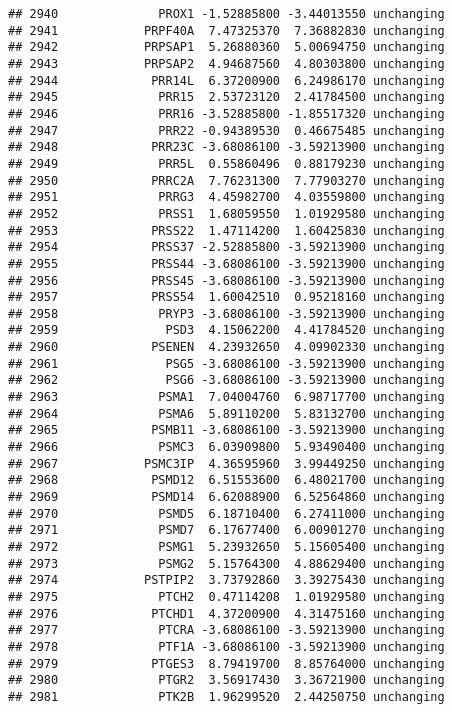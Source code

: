 \documentclass[]{article}
\begin{document}
\begin{verbatim}
## 2940              PROX1 -1.52885800 -3.44013550 unchanging
## 2941            PRPF40A  7.47325370  7.36882830 unchanging
## 2942            PRPSAP1  5.26880360  5.00694750 unchanging
## 2943            PRPSAP2  4.94687560  4.80303800 unchanging
## 2944             PRR14L  6.37200900  6.24986170 unchanging
## 2945              PRR15  2.53723120  2.41784500 unchanging
## 2946              PRR16 -3.52885800 -1.85517320 unchanging
## 2947              PRR22 -0.94389530  0.46675485 unchanging
## 2948             PRR23C -3.68086100 -3.59213900 unchanging
## 2949              PRR5L  0.55860496  0.88179230 unchanging
## 2950             PRRC2A  7.76231300  7.77903270 unchanging
## 2951              PRRG3  4.45982700  4.03559800 unchanging
## 2952              PRSS1  1.68059550  1.01929580 unchanging
## 2953             PRSS22  1.47114200  1.60425830 unchanging
## 2954             PRSS37 -2.52885800 -3.59213900 unchanging
## 2955             PRSS44 -3.68086100 -3.59213900 unchanging
## 2956             PRSS45 -3.68086100 -3.59213900 unchanging
## 2957             PRSS54  1.60042510  0.95218160 unchanging
## 2958              PRYP3 -3.68086100 -3.59213900 unchanging
## 2959               PSD3  4.15062200  4.41784520 unchanging
## 2960             PSENEN  4.23932650  4.09902330 unchanging
## 2961               PSG5 -3.68086100 -3.59213900 unchanging
## 2962               PSG6 -3.68086100 -3.59213900 unchanging
## 2963              PSMA1  7.04004760  6.98717700 unchanging
## 2964              PSMA6  5.89110200  5.83132700 unchanging
## 2965             PSMB11 -3.68086100 -3.59213900 unchanging
## 2966              PSMC3  6.03909800  5.93490400 unchanging
## 2967            PSMC3IP  4.36595960  3.99449250 unchanging
## 2968             PSMD12  6.51553600  6.48021700 unchanging
## 2969             PSMD14  6.62088900  6.52564860 unchanging
## 2970              PSMD5  6.18710400  6.27411000 unchanging
## 2971              PSMD7  6.17677400  6.00901270 unchanging
## 2972              PSMG1  5.23932650  5.15605400 unchanging
## 2973              PSMG2  5.15764300  4.88629400 unchanging
## 2974            PSTPIP2  3.73792860  3.39275430 unchanging
## 2975              PTCH2  0.47114208  1.01929580 unchanging
## 2976             PTCHD1  4.37200900  4.31475160 unchanging
## 2977              PTCRA -3.68086100 -3.59213900 unchanging
## 2978              PTF1A -3.68086100 -3.59213900 unchanging
## 2979             PTGES3  8.79419700  8.85764000 unchanging
## 2980              PTGR2  3.56917430  3.36721900 unchanging
## 2981              PTK2B  1.96299520  2.44250750 unchanging

\end{verbatim}
\end{document}
